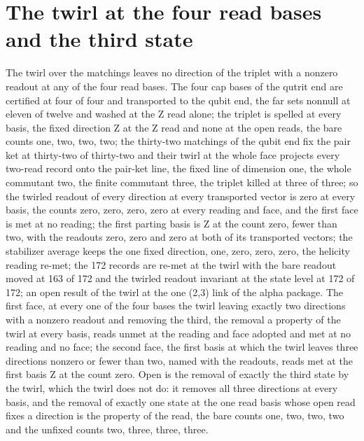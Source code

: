 \section{The twirl at the four read bases and the third state}\label{mod:V-1-D541750-w-wrlt}
\begin{chwall}\label{box:V-1-D541750-w-wrlt:1}
The twirl over the matchings leaves no direction of the triplet with a nonzero readout at any of the four read bases. The four cap bases of the qutrit end are certified at four of four and transported to the qubit end, the far sets nonnull at eleven of twelve and washed at the Z read alone; the triplet is spelled at every basis, the fixed direction Z at the Z read and none at the open reads, the bare counts one, two, two, two; the thirty-two matchings of the qubit end fix the pair ket at thirty-two of thirty-two and their twirl at the whole face projects every two-read record onto the pair-ket line, the fixed line of dimension one, the whole commutant two, the finite commutant three, the triplet killed at three of three; so the twirled readout of every direction at every transported vector is zero at every basis, the counts zero, zero, zero, zero at every reading and face, and the first face is met at no reading; the first parting basis is Z at the count zero, fewer than two, with the readouts zero, zero and zero at both of its transported vectors; the stabilizer average keeps the one fixed direction, one, zero, zero, zero, the helicity reading re-met; the 172 records are re-met at the twirl with the bare readout moved at 163 of 172 and the twirled readout invariant at the state level at 172 of 172; an open result of the twirl at the one (2,3) link of the alpha package.
The first face, at every one of the four bases the twirl leaving exactly two directions with a nonzero readout and removing the third, the removal a property of the twirl at every basis, reads unmet at the reading and face adopted and met at no reading and no face; the second face, the first basis at which the twirl leaves three directions nonzero or fewer than two, named with the readouts, reads met at the first basis Z at the count zero. Open is the removal of exactly the third state by the twirl, which the twirl does not do: it removes all three directions at every basis, and the removal of exactly one state at the one read basis whose open read fixes a direction is the property of the read, the bare counts one, two, two, two and the unfixed counts two, three, three, three.
\end{chwall}
